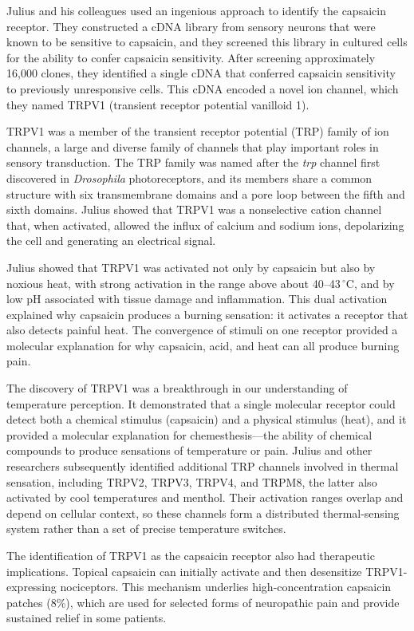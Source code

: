 Julius and his colleagues used an ingenious approach to identify the capsaicin receptor. They constructed a cDNA library from sensory neurons that were known to be sensitive to capsaicin, and they screened this library in cultured cells for the ability to confer capsaicin sensitivity. After screening approximately 16,000 clones, they identified a single cDNA that conferred capsaicin sensitivity to previously unresponsive cells. This cDNA encoded a novel ion channel, which they named TRPV1 (transient receptor potential vanilloid 1).

TRPV1 was a member of the transient receptor potential (TRP) family of ion channels, a large and diverse family of channels that play important roles in sensory transduction. The TRP family was named after the \textit{trp} channel first discovered in \textit{Drosophila} photoreceptors, and its members share a common structure with six transmembrane domains and a pore loop between the fifth and sixth domains. Julius showed that TRPV1 was a nonselective cation channel that, when activated, allowed the influx of calcium and sodium ions, depolarizing the cell and generating an electrical signal.

Julius showed that TRPV1 was activated not only by capsaicin but also by noxious heat, with strong activation in the range above about 40--43\,$^{\circ}$C, and by low pH associated with tissue damage and inflammation. This dual activation explained why capsaicin produces a burning sensation: it activates a receptor that also detects painful heat. The convergence of stimuli on one receptor provided a molecular explanation for why capsaicin, acid, and heat can all produce burning pain.

The discovery of TRPV1 was a breakthrough in our understanding of temperature perception. It demonstrated that a single molecular receptor could detect both a chemical stimulus (capsaicin) and a physical stimulus (heat), and it provided a molecular explanation for chemesthesis---the ability of chemical compounds to produce sensations of temperature or pain. Julius and other researchers subsequently identified additional TRP channels involved in thermal sensation, including TRPV2, TRPV3, TRPV4, and TRPM8, the latter also activated by cool temperatures and menthol. Their activation ranges overlap and depend on cellular context, so these channels form a distributed thermal-sensing system rather than a set of precise temperature switches.

The identification of TRPV1 as the capsaicin receptor also had therapeutic implications. Topical capsaicin can initially activate and then desensitize TRPV1-expressing nociceptors. This mechanism underlies high-concentration capsaicin patches (8\%), which are used for selected forms of neuropathic pain and provide sustained relief in some patients.

